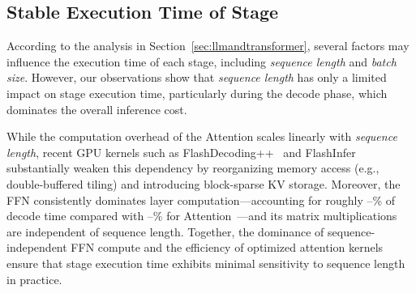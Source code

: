 \subsection{Stable Execution Time of Stage}
\label{sec:stableexecutiontime}



According to the analysis in Section~\ref{sec:llmandtransformer}, several factors may influence the execution time of each stage, including \textit{sequence length} and \textit{batch size}.
However, our observations show that \textit{sequence length} has only a limited impact on stage execution time, particularly during the decode phase, which dominates the overall inference cost.




While the computation overhead of the Attention scales linearly with \textit{sequence length}, recent GPU kernels such as FlashDecoding++~\cite{hong2023flashdecoding++} and FlashInfer~\cite{ye2025flashinfer} substantially weaken this dependency by reorganizing memory access (e.g., double-buffered tiling) and introducing block-sparse KV storage.
Moreover, the FFN consistently dominates layer computation—accounting for roughly --\% of decode time compared with --\% for Attention~\cite{cheng2025ecco}—and its matrix multiplications are independent of sequence length.
Together, the dominance of sequence-independent FFN compute and the efficiency of optimized attention kernels ensure that stage execution time exhibits minimal sensitivity to sequence length in practice.

